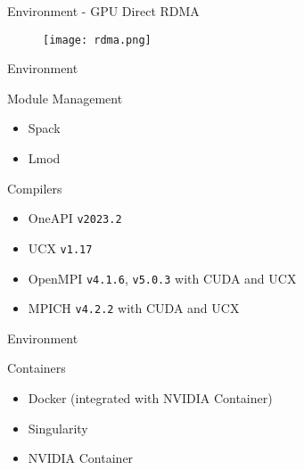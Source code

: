 \documentclass[aspectratio=169]{beamer}
\begin{document}
    \begin{frame}{Environment - GPU Direct RDMA}
        \begin{figure}
            \centering
            \texttt{[image: rdma.png]}
        \end{figure}
    \end{frame}
    
    \begin{frame}{Environment}
        \begin{block}{Module Management}
            \begin{itemize}
                \item Spack
                \item Lmod
            \end{itemize}
        \end{block}
        \begin{block}{Compilers}
            \begin{itemize}
                \item OneAPI \texttt{v2023.2}
                \item UCX \texttt{v1.17}
                \item OpenMPI \texttt{v4.1.6}, \texttt{v5.0.3} with CUDA and UCX
                \item MPICH \texttt{v4.2.2} with CUDA and UCX
            \end{itemize}
        \end{block}
    \end{frame}
    
    \begin{frame}{Environment}
        \begin{block}{Containers}
            \begin{itemize}
                \item Docker (integrated with NVIDIA Container)
                \item Singularity
                \item NVIDIA Container
            \end{itemize}
        \end{block}
    \end{frame}
\end{document}
